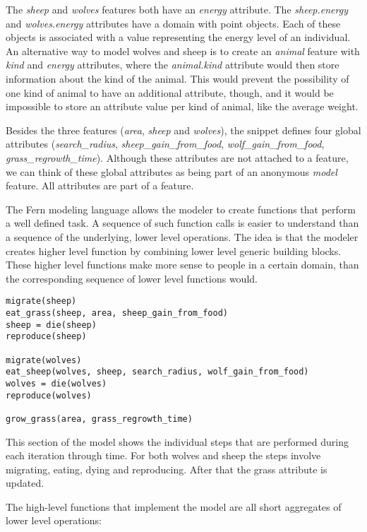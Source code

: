 \documentclass[10pt, a4paper]{article}
\begin{document}
The \emph{sheep} and \emph{wolves} features both have an \emph{energy} attribute. The \emph{sheep.energy} and \emph{wolves.energy} attributes have a domain with point objects. Each of these objects is associated with a value representing the energy level of an individual. An alternative way to model wolves and sheep is to create an \emph{animal} feature with \emph{kind} and \emph{energy} attributes, where the \emph{animal.kind} attribute would then store information about the kind of the animal. This would prevent the possibility of one kind of animal to have an additional attribute, though, and it would be impossible to store an attribute value per kind of animal, like the average weight.

Besides the three features (\emph{area}, \emph{sheep} and \emph{wolves}), the snippet defines four global attributes (\emph{search\_radius}, \emph{sheep\_gain\_from\_food}, \emph{wolf\_gain\_from\_food}, \emph{grass\_regrowth\_time}). Although these attributes are not attached to a feature, we can think of these global attributes as being part of an anonymous \emph{model} feature. All attributes are part of a feature.


The Fern modeling language allows the modeler to create functions that perform a well defined task. A sequence of such function calls is easier to understand than a sequence of the underlying, lower level operations. The idea is that the modeler creates higher level function by combining lower level generic building blocks. These higher level functions make more sense to people in a certain domain, than the corresponding sequence of lower level functions would.

\begin{lstlisting}
migrate(sheep)
eat_grass(sheep, area, sheep_gain_from_food)
sheep = die(sheep)
reproduce(sheep)

migrate(wolves)
eat_sheep(wolves, sheep, search_radius, wolf_gain_from_food)
wolves = die(wolves)
reproduce(wolves)

grow_grass(area, grass_regrowth_time)
\end{lstlisting}

This section of the model shows the individual steps that are performed during each iteration through time. For both wolves and sheep the steps involve migrating, eating, dying and reproducing. After that the grass attribute is updated.

The high-level functions that implement the model are all short aggregates of lower level operations:
\end{document}
